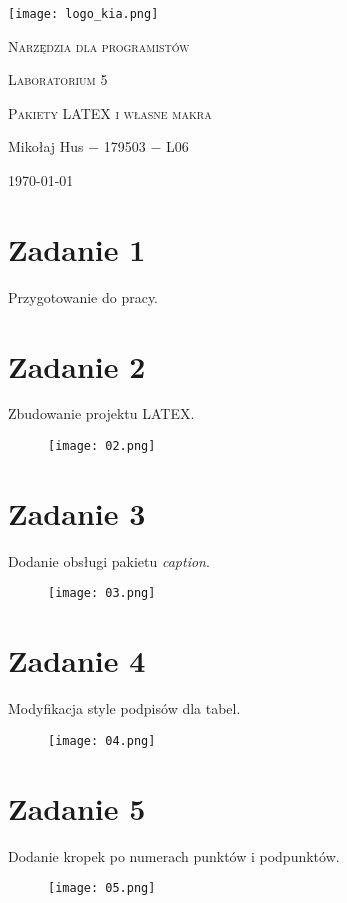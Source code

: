 \documentclass[fleqn,onecolumn,a4paper,12pt,titlepage]{article}
\begin{document}
\begin{titlepage}
    \texttt{[image: logo\_kia.png]}\par\vspace{3cm}
    \centering
    {\LARGE \textsc{Narzędzia dla programistów} \par}
    \vspace{2cm}
    {\Large \textsc{Laboratorium 5} \par} %
    \vspace{2cm}
    {\textsc{Pakiety LATEX i własne makra} \par} %
    \vfill
    Mikołaj Hus $-$ 179503 $-$ L06 \par %
    \vspace{2cm}
    {\large {\today} \par}
\end{titlepage}

\section*{Zadanie 1}
Przygotowanie do pracy.

\section*{Zadanie 2}
Zbudowanie projektu LATEX.
\begin{figure}[H]%
    \centering\texttt{[image: 02.png]}
\end{figure}

\section*{Zadanie 3}
Dodanie obsługi pakietu \textit{caption}.
\begin{figure}[H]%
    \centering\texttt{[image: 03.png]}
\end{figure}

\section*{Zadanie 4}
Modyfikacja style podpisów dla tabel.
\begin{figure}[H]%
    \centering\texttt{[image: 04.png]}
\end{figure}

\section*{Zadanie 5}
Dodanie kropek po numerach punktów i podpunktów.
\begin{figure}[H]%
    \centering\texttt{[image: 05.png]}
\end{figure}
\end{document}
